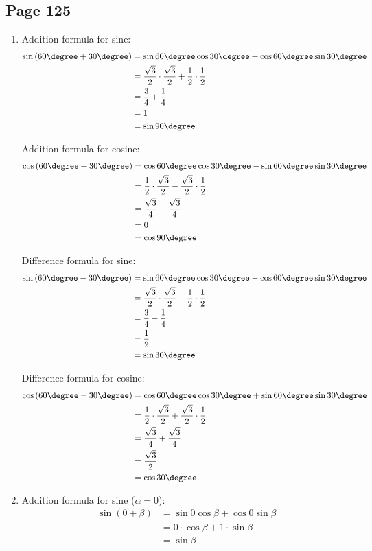 \documentclass{article}
\newenvironment{solutions}[1]
{\subsection*{#1}
 \begin{enumerate}[leftmargin=1.5em]}
{\end{enumerate}}
\newcommand{\solution}{\item}
\begin{document}
\begin{solutions}{Page 125}
\solution %
Addition formula for sine:
\begin{align*}
\sin\left(60\degree + 30\degree\right)
&= \sin{60\degree}\cos{30\degree} + \cos{60\degree}\sin{30\degree} \\
&= \dfrac{\sqrt{3}}{2} \cdot \dfrac{\sqrt{3}}{2} + \dfrac{1}{2} \cdot \dfrac{1}{2}\\
&= \dfrac{3}{4} + \dfrac{1}{4} \\
&= 1 \\
&= \sin{90\degree}
\end{align*}

Addition formula for cosine:
\begin{align*}
\cos\left(60\degree + 30\degree\right)
&= \cos{60\degree}\cos{30\degree} - \sin{60\degree}\sin{30\degree} \\
&= \dfrac{1}{2} \cdot \dfrac{\sqrt{3}}{2} - \dfrac{\sqrt{3}}{2} \cdot \dfrac{1}{2}\\
&= \dfrac{\sqrt{3}}{4} - \dfrac{\sqrt{3}}{4} \\
&= 0 \\
&= \cos{90\degree}
\end{align*}

Difference formula for sine:
\begin{align*}
\sin\left(60\degree - 30\degree\right)
&= \sin{60\degree}\cos{30\degree} - \cos{60\degree}\sin{30\degree} \\
&= \dfrac{\sqrt{3}}{2} \cdot \dfrac{\sqrt{3}}{2} - \dfrac{1}{2} \cdot \dfrac{1}{2}\\
&= \dfrac{3}{4} - \dfrac{1}{4} \\
&= \dfrac{1}{2} \\
&= \sin{30\degree}
\end{align*}

Difference formula for cosine:
\begin{align*}
\cos\left(60\degree - 30\degree\right)
&= \cos{60\degree}\cos{30\degree} + \sin{60\degree}\sin{30\degree} \\
&= \dfrac{1}{2} \cdot \dfrac{\sqrt{3}}{2} + \dfrac{\sqrt{3}}{2} \cdot \dfrac{1}{2}\\
&= \dfrac{\sqrt{3}}{4} + \dfrac{\sqrt{3}}{4} \\
&= \dfrac{\sqrt{3}}{2} \\
&= \cos{30\degree}
\end{align*}

\solution %
Addition formula for sine ($\alpha = 0$):
\begin{align*}
\sin\left(0 + \beta\right) 
&= \sin{0}\cos{\beta} + \cos{0}\sin{\beta} \\
&= 0 \cdot \cos{\beta} + 1 \cdot \sin{\beta} \\
&= \sin{\beta}
\end{align*}


\end{solutions}
\end{document}

